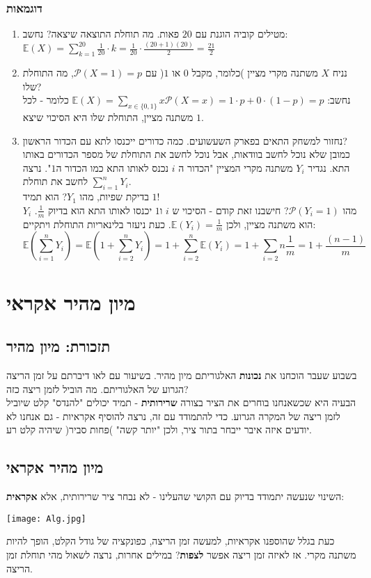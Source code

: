 \documentclass{article}
\newcommand{\EE}{\ensuremath{\mathbb{E}}}
\newcommand{\Pp}{\ensuremath{\mathcal{P}}}
\begin{document}
\subsubsection{דוגמאות}
\begin{enumerate}
\item מטילים קוביה הוגנת עם $20$ פאות. מה תוחלת התוצאה שיצאה? נחשב:
$\EE(X) = \sum_{k=1}^{20} \frac{1}{20}\cdot k = \frac{1}{20}\cdot \frac{(20+1)(20)}{2} = \frac{21}{2}$
\item נניח $X$ משתנה מקרי מציין )כלומר, מקבל $0$ או $1$( עם
$\Pp(X=1) = p$, מה התוחלת שלו?\\
נחשב:
$\EE(X) = \sum_{x\in \{0,1\}} x\Pp(X=x) = 1\cdot p + 0\cdot(1-p) = p$ כלומר - לכל משתנה מציין, התוחלת שלו היא הסיכוי שיצא $1$.
\item נחזור למשחק התאים בפארק השעשועים. כמה כדורים ייכנסו לתא עם הכדור הראשון?\\
כמובן שלא נוכל לחשב בוודאות, אבל נוכל לחשב את התוחלת של מספר הכדורים באותו התא. נגדיר
$Y_i$ משתנה מקרי המציין "הכדור ה
$i$ נכנס לאותו התא כמו הכדור ה$1$". נרצה לחשב את תוחלת
$\sum_{i=1}^n Y_i$.\\
בדיקת שפיות, מהו
$Y_1$? הוא תמיד $1$!\\
מהו
$\Pp(Y_i = 1)$? חישבנו זאת קודם - הסיכוי ש
$i$ ו$1$ יכנסו לאותו התא הוא בדיוק
$\frac{1}{m}$. 
$Y_i$ הוא משתנה מציין, ולכן
$\EE(Y_i) = \frac{1}{m}$. כעת ניעזר בלינאריות התוחלת ויתקיים:
$$\EE\left(\sum_{i=1}^n Y_i \right) = \EE\left(1 + \sum_{i=2}^n Y_i \right) = 1+\sum_{i=2}^n \EE(Y_i) = 1+\sum_{i=2}n \frac{1}{m} = 1+\frac{(n-1)}{m}$$

\end{enumerate}
\section*{מיון מהיר אקראי}
\subsection*{תזכורת: מיון מהיר}
בשבוע שעבר הוכחנו את \textbf{נכונות} האלגוריתם מיון מהיר. בשיעור עם לאו דיברתם על זמן הריצה הגרוע של האלגוריתם. מה הוביל לזמן ריצה כזה?\\
הבעיה היא שכשאנחנו בוחרים את הציר בצורה \textbf{שרירותית} - תמיד יכולים "להנדס" קלט שיוביל לזמן ריצה של המקרה הגרוע. כדי להתמודד עם זה, נרצה להוסיף אקראיות - גם אנחנו לא יודעים איזה איבר ייבחר בתור ציר, ולכן "יותר קשה" )פחות סביר( שיהיה קלט רע.
\subsection*{מיון מהיר אקראי}
השינוי שנעשה יתמודד בדיוק עם הקושי שהעלינו - לא נבחר ציר שרירותית, אלא \textbf{אקראית}:
\begin{flushright}
\begin{otherlanguage}{english}
\texttt{[image: Alg.jpg]}
\end{otherlanguage}
\end{flushright}
כעת בגלל שהוספנו אקראיות, למעשה זמן הריצה, כפונקציה של גודל הקלט, הופך להיות משתנה מקרי. אז לאיזה זמן ריצה אפשר \textbf{לצפות}? במילים אחרות, נרצה לשאול מהי תוחלת זמן הריצה.\\
\end{document}
